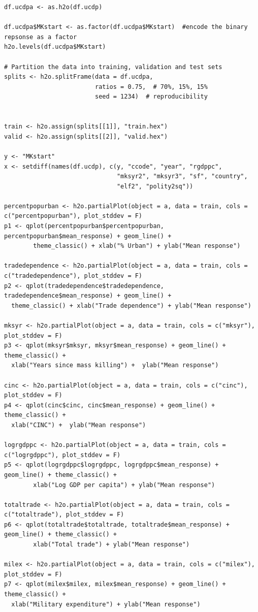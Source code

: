 \begin{verbatim}
df.ucdpa <- as.h2o(df.ucdp)

df.ucdpa$MKstart <- as.factor(df.ucdpa$MKstart)  #encode the binary repsonse as a factor
h2o.levels(df.ucdpa$MKstart)

# Partition the data into training, validation and test sets
splits <- h2o.splitFrame(data = df.ucdpa, 
                         ratios = 0.75,  # 70%, 15%, 15%
                         seed = 1234)  # reproducibility


train <- h2o.assign(splits[[1]], "train.hex")   
valid <- h2o.assign(splits[[2]], "valid.hex") 

y <- "MKstart"
x <- setdiff(names(df.ucdp), c(y, "ccode", "year", "rgdppc",
                               "mksyr2", "mksyr3", "sf", "country",
                               "elf2", "polity2sq")) 

percentpopurban <- h2o.partialPlot(object = a, data = train, cols = c("percentpopurban"), plot_stddev = F)
p1 <- qplot(percentpopurban$percentpopurban, percentpopurban$mean_response) + geom_line() +
        theme_classic() + xlab("% Urban") + ylab("Mean response")

tradedependence <- h2o.partialPlot(object = a, data = train, cols = c("tradedependence"), plot_stddev = F)
p2 <- qplot(tradedependence$tradedependence, tradedependence$mean_response) + geom_line() +
  theme_classic() + xlab("Trade dependence") + ylab("Mean response")

mksyr <- h2o.partialPlot(object = a, data = train, cols = c("mksyr"), plot_stddev = F)
p3 <- qplot(mksyr$mksyr, mksyr$mean_response) + geom_line() + theme_classic() + 
  xlab("Years since mass killing") +  ylab("Mean response")

cinc <- h2o.partialPlot(object = a, data = train, cols = c("cinc"), plot_stddev = F)
p4 <- qplot(cinc$cinc, cinc$mean_response) + geom_line() + theme_classic() + 
  xlab("CINC") +  ylab("Mean response")

logrgdppc <- h2o.partialPlot(object = a, data = train, cols = c("logrgdppc"), plot_stddev = F)
p5 <- qplot(logrgdppc$logrgdppc, logrgdppc$mean_response) + geom_line() + theme_classic() +
        xlab("Log GDP per capita") + ylab("Mean response")

totaltrade <- h2o.partialPlot(object = a, data = train, cols = c("totaltrade"), plot_stddev = F)
p6 <- qplot(totaltrade$totaltrade, totaltrade$mean_response) + geom_line() + theme_classic() +
        xlab("Total trade") + ylab("Mean response")

milex <- h2o.partialPlot(object = a, data = train, cols = c("milex"), plot_stddev = F)
p7 <- qplot(milex$milex, milex$mean_response) + geom_line() + theme_classic() +
  xlab("Military expenditure") + ylab("Mean response")


\end{verbatim}
